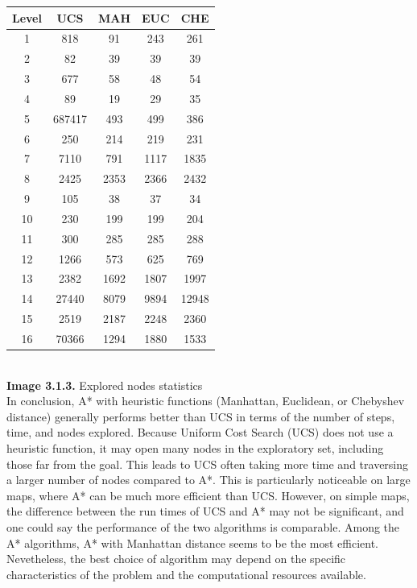 \documentclass[english, a4paper,12pt]{article}
\begin{document}
\hspace*{50mm}\begin{tabular}{|c|c|c|c|c|}
\hline
Level & UCS & MAH & EUC & CHE \\
\hline
1 & 818 & 91 & 243 & 261 \\
2 & 82 & 39 & 39 & 39\\
3 & 677 & 58 & 48 & 54 \\
4 & 89 & 19 & 29 & 35\\
5 & 687417 & 493 & 499 & 386\\
6 & 250 & 214 & 219 & 231\\
7 & 7110 & 791 & 1117 & 1835\\
8 & 2425 & 2353 & 2366 & 2432\\
9 & 105 & 38 & 37 & 34 \\
10 & 230 & 199 & 199 & 204\\
11 & 300 & 285 & 285 & 288 \\
12 & 1266 & 573 & 625 & 769 \\
13 & 2382 & 1692& 1807 & 1997 \\
14 & 27440 & 8079 & 9894 & 12948 \\
15 & 2519 & 2187 & 2248 & 2360 \\
16 & 70366 & 1294 & 1880 & 1533 \\
\hline
\end{tabular}
\vspace*{3mm}
\\
\hspace*{55mm}\textbf{Image 3.1.3. } Explored nodes statistics
\vspace*{3mm}
\\
\hspace*{7mm}In conclusion, A* with heuristic functions (Manhattan, Euclidean, or Chebyshev distance) generally performs better than UCS in terms of the number of steps, time, and nodes explored. Because Uniform Cost Search (UCS) does not use a heuristic function, it may open many nodes in the exploratory set, including those far from the goal. This leads to UCS often taking more time and traversing a larger number of nodes compared to A*. This is particularly noticeable on large maps, where A* can be much more efficient than UCS. However, on simple maps, the difference between the run times of UCS and A* may not be significant, and one could say the performance of the two algorithms is comparable. Among the A* algorithms, A* with Manhattan distance seems to be the most efficient. Nevetheless, the best choice of algorithm may depend on the specific characteristics of the problem and the computational resources available.
\end{document}
